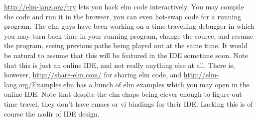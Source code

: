\url{http://elm-lang.org/try} lets you hack elm code interactively. You may 
compile the code and run it in the browser, you can even hot-swap code for a 
running program. The elm guys have been working on a time-travelling debugger 
in which you may turn back time in your running program, change the source, 
and resume the program, seeing previous paths being played out at the same 
time. It would be natural to assume that this will be featured in the IDE 
sometime soon. Note that this is just an online IDE, and not really anything 
else at all. There is, however, \url{http://share-elm.com/} for sharing elm 
code, and \url{http://elm-lang.org/Examples.elm} has a bunch of elm examples 
which you may open in the online IDE. Note that despite the elm chaps being 
clever enough to figure out time travel, they don't have emacs or vi bindings 
for their IDE. Lacking this is of course the nadir of IDE design.
